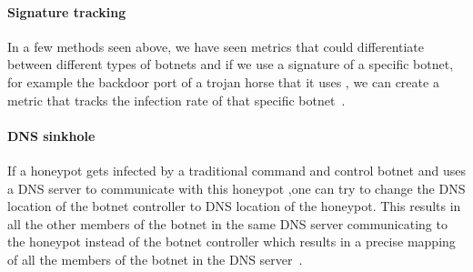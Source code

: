 \paragraph{Signature tracking}
In a few methods seen above, we have seen metrics that could differentiate between different types of botnets and if we use a signature of a specific botnet, for example the backdoor port of a trojan horse that it uses , we can create a metric that tracks the infection rate of that specific botnet~\cite{AM2005}.

\paragraph{DNS sinkhole}
If a honeypot gets infected by a traditional command and control botnet  and uses a DNS server to communicate with this honeypot ,one can try to change the DNS location of the botnet controller to DNS location of the honeypot. This results in all the other members of the botnet in the same DNS server communicating to the honeypot instead of the botnet controller which results in a precise mapping of all the members of the botnet in the DNS server~\cite{WP2010}.
